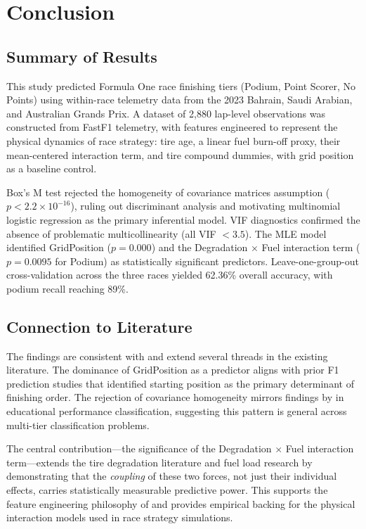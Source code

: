 \section{Conclusion}

\subsection{Summary of Results}

This study predicted Formula One race finishing tiers (Podium, Point Scorer,
No Points) using within-race telemetry data from the 2023 Bahrain, Saudi
Arabian, and Australian Grands Prix. A dataset of 2,880 lap-level
observations was constructed from FastF1 telemetry, with features engineered
to represent the physical dynamics of race strategy: tire age, a linear fuel
burn-off proxy, their mean-centered interaction term, and tire compound
dummies, with grid position as a baseline control.

Box's M test rejected the homogeneity of covariance matrices assumption
($p < 2.2 \times 10^{-16}$), ruling out discriminant analysis and
motivating multinomial logistic regression as the primary inferential model.
VIF diagnostics confirmed the absence of problematic multicollinearity (all
VIF $< 3.5$). The MLE model identified GridPosition ($p = 0.000$) and the
Degradation $\times$ Fuel interaction term ($p = 0.0095$ for Podium) as
statistically significant predictors. Leave-one-group-out cross-validation
across the three races yielded 62.36\% overall accuracy, with podium recall
reaching 89\%.

\subsection{Connection to Literature}

The findings are consistent with and extend several threads in the existing
literature. The dominance of GridPosition as a predictor aligns with prior
F1 prediction studies \parencite{kuhn2022f1, song2020} that identified
starting position as the primary determinant of finishing order. The
rejection of covariance homogeneity mirrors findings by
\textcite{mendoza2023} in educational performance classification, suggesting
this pattern is general across multi-tier classification problems.

The central contribution---the significance of the Degradation $\times$ Fuel
interaction term---extends the tire degradation literature
\parencite{perdomo2021tire, baldi2022} and fuel load research
\parencite{oldknow2022fuel} by demonstrating that the \textit{coupling} of
these two forces, not just their individual effects, carries statistically
measurable predictive power. This supports the feature engineering philosophy
of \textcite{santos2020} and provides empirical backing for the physical
interaction models used in race strategy simulations.

